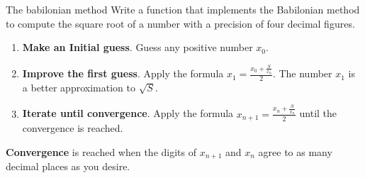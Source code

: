 \documentclass[xcolor={dvipsnames,rgb}, aspectratio=169]{beamer}
\begin{document}
\begin{frame}{The babilonian method}
\textcolor{mylilas}{Write a function that implements the Babilonian method to compute the
   square root of a number with a precision of four decimal figures}.
\begin{enumerate}
   \item \textbf{Make an Initial guess}.
      Guess any positive number $x_{0}$.
   \item \textbf{Improve the first guess}.
      Apply the formula $x_{1} = \frac{x_{0} + \frac{S}{x_{0}}}{2}$. The number $x_{1}$
      is a better approximation to $\sqrt{S}$.
   \item \textbf{Iterate until convergence}.
      Apply the formula $x_{n+1} = \frac{x_{n} + \frac{S}{x_{n}}}{2}$ until the
      convergence is reached.
\end{enumerate}
\textbf{Convergence} is reached when the digits of $x_{n+1}$ and $x_{n}$ agree to as many
   decimal places as you desire.
\end{frame}
\end{document}
